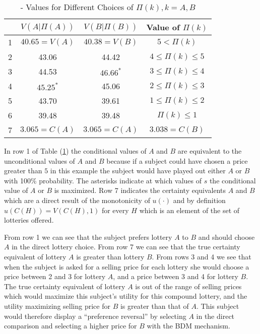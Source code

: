 \documentclass[../main.tex]{subfiles}
\begin{document}
\begin{table}[ht]
	\centering
	\caption{ \textcite{Karni1987} - Values for Different Choices of $\Pi(k),k = A,B$}
	\label{tb:KS1987:Pi}
	\begin{tabular}{cccc}
		   & $V(A|\Pi(A))$  & $V(B|\Pi(B))$  & Value of $\Pi(k)$      \\\hline
		1  & $40.65 = V(A)$ & $40.38 = V(B)$ & $5 < \Pi(k)$           \\
		2  & 43.06          & 44.42          & $4 \leq \Pi(k) \leq 5$ \\
		3  & 44.53          & $46.66^*$      & $3 \leq \Pi(k) \leq 4$ \\
		4  & $45.25^*$      & 45.06          & $2 \leq \Pi(k) \leq 3$ \\
		5  & 43.70          & 39.61          & $1 \leq \Pi(k) \leq 2$ \\
		6  & 39.48          & 39.48          & $\Pi(k) \leq 1$        \\\hline
		7  & $3.065 = C(A)$ & $3.065 = C(A)$ & $3.038 = C(B)$
	\end{tabular}
\end{table}

In row 1 of Table (\ref{tb:KS1987:Pi}) the conditional values of $A$ and $B$ are equivalent to the unconditional values of $A$ and $B$ because if a subject could have chosen a price greater than $5$ in this example the subject would have played out either $A$ or $B$ with 100\% probability.
The asterisks indicate at which values of $s$ the conditional value of $A$ or $B$ is maximized.
Row 7 indicates the certainty equivalents $A$ and $B$ which are a direct result of the monotonicity of $u(\cdot)$ and by definition $u(C(H)) = V(C(H),1)$ for every $H$ which is an element of the set of lotteries offered. 

From row 1 we can see that the subject prefers lottery $A$ to $B$ and should choose $A$ in the direct lottery choice.
From row 7 we can see that the true certainty equivalent of lottery $A$ is greater than lottery $B$.
From rows 3 and 4 we see that when the subject is asked for a selling price for each lottery she would choose a price between 2 and 3 for lottery $A$, and a price between 3 and 4 for lottery $B$.
The true certainty equivalent of lottery $A$ is out of the range of selling prices which would maximize this subject's utility for this compound lottery, and the utility maximizing selling price for $B$ is greater than that of $A$.
This subject would therefore display a \enquote{preference reversal} by selecting $A$ in the direct comparison and selecting a higher price for $B$ with the BDM mechanism.
\end{document}
